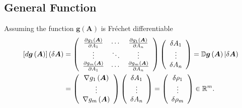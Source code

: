 \documentclass[aps,preprint]{revtex4}%
\begin{document}
\subsection{General Function}

Assuming the function $\boldsymbol{g}\left(  \boldsymbol{A}\right)  $ is
Fr\'{e}chet differentiable
\begin{align}
\left[  d\boldsymbol{g}\left(  \boldsymbol{A}\right)  \right]  \left(
\delta\boldsymbol{A}\right)   &  =\left(
\begin{array}
[c]{ccc}%
\frac{\partial g_{1}\left(  \boldsymbol{A}\right)  }{\partial A_{1}} & \cdots
& \frac{\partial g_{1}\left(  \boldsymbol{A}\right)  }{\partial A_{n}}\\
\vdots & \ddots & \vdots\\
\frac{\partial g_{m}\left(  \boldsymbol{A}\right)  }{\partial A_{1}} & \cdots
& \frac{\partial g_{m}\left(  \boldsymbol{A}\right)  }{\partial A_{n}}%
\end{array}
\right)  \left(
\begin{array}
[c]{c}%
\delta A_{1}\\
\vdots\\
\delta A_{n}%
\end{array}
\right)  =\mathbb{D}\boldsymbol{g}\left(  \boldsymbol{A}\right)  \left\vert
\delta\boldsymbol{A}\right) \nonumber\\
&  =\left(
\begin{array}
[c]{c}%
\nabla g_{1}\left(  \boldsymbol{A}\right) \\
\vdots\\
\nabla g_{m}\left(  \boldsymbol{A}\right)
\end{array}
\right)  \left(
\begin{array}
[c]{c}%
\delta A_{1}\\
\vdots\\
\delta A_{n}%
\end{array}
\right)  =\left(
\begin{array}
[c]{c}%
\delta\rho_{1}\\
\vdots\\
\delta\rho_{m}%
\end{array}
\right)  \in\mathbb{R}^{m}.
\end{align}%
\end{document}
